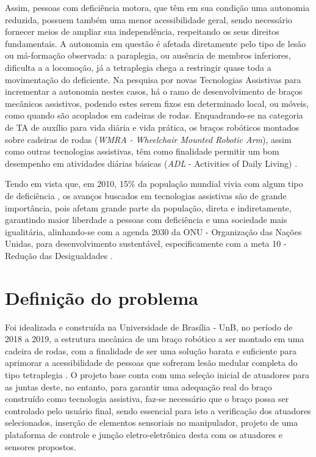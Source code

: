 Assim, pessoas com deficiência motora, que têm em sua condição uma autonomia reduzida, possuem também uma menor acessibilidade geral, sendo necessário fornecer
meios de ampliar sua independência, respeitando os seus direitos fundamentais. A autonomia em questão é afetada diretamente pelo tipo de lesão ou 
má-formação observada: a paraplegia, ou ausência de membros inferiores, dificulta a a locomoção, já a tetraplegia chega a restringir quase toda a movimentação do deficiente.
Na pesquisa por novas Tecnologias Assistivas para incrementar a autonomia nestes casos, há o ramo de desenvolvimento de braços mecânicos assistivos, podendo 
estes serem fixos em determinado local, ou móveis, como quando são acoplados em cadeiras de rodas. Enquadrando-se na categoria de TA de auxílio para vida
diária e vida prática, os braços robóticos montados sobre cadeiras de rodas (\textit{WMRA - Wheelchair Mounted Robotic Arm}), assim como outras tecnologias 
assistivas, têm como finalidade permitir um bom desempenho em atividades diárias básicas (\textit{ADL} - Activities of Daily Living) \cite{capille2010kinematic}. 

Tendo em vista que, em 2010, 15\% da população mundial vivia com algum tipo de deficiência \cite{world2011world}, os avanços buscados em tecnologias 
assistivas são de grande importância, pois afetam grande parte da população, direta e indiretamente, 
garantindo maior liberdade a pessoas com deficiência e uma sociedade
mais igualitária, alinhando-se com a agenda 2030 da ONU - Organização das Nações Unidas,
para desenvolvimento sustentável, especificamente com a meta 10 - Redução das Desigualdades \cite{un2030agenda}.

\section{Definição do problema}

Foi idealizada e construída na Universidade de Brasília - UnB, no período de 2018 a 2019, 
a estrutura mecânica de um braço robótico a ser montado em uma cadeira de rodas, com a finalidade de ser
uma solução barata e suficiente para aprimorar a acessibilidade de pessoas que sofreram lesão medular completa do tipo tetraplegia \cite{fernando2019assistivo}. 
O projeto base conta com uma seleção inicial de atuadores para as juntas deste, no entanto, para garantir uma adequação real do braço construído como 
tecnologia assistiva, faz-se necessário que o braço possa ser controlado pelo usuário final, sendo essencial para isto a verificação dos atuadores selecionados, 
inserção de elementos sensoriais no manipulador, projeto de uma plataforma de controle e junção eletro-eletrônica desta com os atuadores e sensores propostos.

